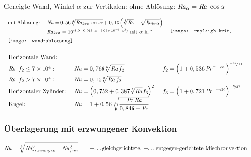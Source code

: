 	\vskip 0.2cm
	Geneigte Wand, Winkel $ \alpha $ zur Vertikalen: \qquad ohne Ablösung: $ \operatorname{\mathit{R\kern-.10em a}}_{\alpha} = \operatorname{\mathit{R\kern-.10em a}}\ \cos\alpha $

	\setlength{\abovedisplayskip}{-10pt}
	\[ \arraycolsep=0.7em  \def\arraystretch{1.4}
	\begin{array}{llc}
		\text{mit Ablösung:} & \Nuss = 0,56 \displaystyle\sqrt[4]{\Rayl_{krit}\, \cos\alpha} + 0,13 \left( \sqrt[3]{\Rayl} - \sqrt[3]{\Rayl_{krit}} \right) & \multirow{3}{5cm}{\texttt{[image: rayleigh-krit]}} \\
		 & \Rayl_{krit} = 10^{(8,9 - 0,013\ \alpha - \num{5,95e-4}\ \alpha^2)} \text{ mit } \alpha \text{ in °} &\\
		 \multicolumn{2}{l}{\texttt{[image: wand-abloesung]}}
	\end{array}\]

	\setlength{\abovedisplayskip}{-15pt}
	\[ \arraycolsep=0.7em  \def\arraystretch{1.4}
	\begin{array}{lll}
		\text{Horizontale Wand:} &&\\
		 \Rayl\ f_2 \leq \num{7e4}: & \Nuss = 0,766 \displaystyle\sqrt[5]{\Rayl f_2} & f_2 = \left( 1+ 0,536 \Pran ^{\nicefrac{-11}{20}} \right) ^{\nicefrac{-20}{11}} \\
		 \Rayl\ f_2 > \num{7e4}: & \Nuss = 0,15 \displaystyle\sqrt[3]{\Rayl f_2} &\\
		 \text{Horizontaler Zylinder:} & \Nuss = \left(0,752 + 0,387 \sqrt[6]{\Rayl} f_3 \right)^2 & f_3 = \left( 1 + 0,721\Pran^{\nicefrac{-11}{20}}\right) ^{\nicefrac{-8}{27}} \\
		 \text{Kugel:} & \Nuss = 1 + 0,56\, \sqrt[4]{\dfrac{\Pran\Rayl}{0,846 + \Pran}}
	\end{array}\]

\subsubsection{Überlagerung mit erzwungener Konvektion}
	\[ \operatorname{\mathit{N\kern-.20em u}} = \sqrt[3]{\operatorname{\mathit{N\kern-.20em u}}_{erzwungen}^3 \pm \operatorname{\mathit{N\kern-.20em u}}_{frei}^3} \qquad \text{+\dots gleichgerichtete, $-$\dots entgegen-gerichtete Mischkonvektion}\]

\clearpage
